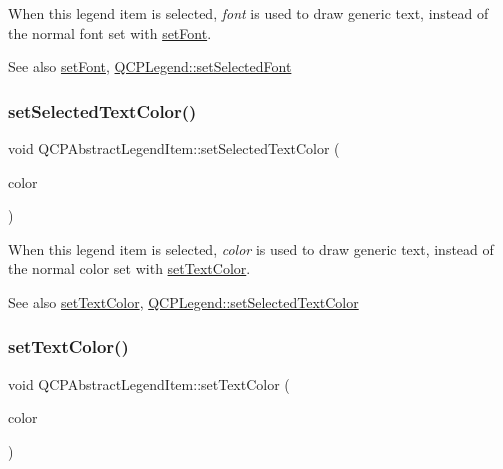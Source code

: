 When this legend item is selected, {\itshape font} is used to draw generic text, instead of the normal font set with \mbox{\hyperlink{class_q_c_p_abstract_legend_item_a409c53455d8112f71d70c0c43eb10265}{set\+Font}}.

\begin{DoxySeeAlso}{See also}
\mbox{\hyperlink{class_q_c_p_abstract_legend_item_a409c53455d8112f71d70c0c43eb10265}{set\+Font}}, \mbox{\hyperlink{class_q_c_p_legend_ab580a01c3c0a239374ed66c29edf5ad2}{Q\+C\+P\+Legend\+::set\+Selected\+Font}} 
\end{DoxySeeAlso}
\mbox{\label{class_q_c_p_abstract_legend_item_a4d01d008ee1a5bfe9905b0397a421936}} 
\subsubsection{\texorpdfstring{setSelectedTextColor()}{setSelectedTextColor()}}
{\footnotesize\ttfamily void Q\+C\+P\+Abstract\+Legend\+Item\+::set\+Selected\+Text\+Color (\begin{DoxyParamCaption}\item[{const Q\+Color \&}]{color }\end{DoxyParamCaption})}

When this legend item is selected, {\itshape color} is used to draw generic text, instead of the normal color set with \mbox{\hyperlink{class_q_c_p_abstract_legend_item_a6ebace6aaffaedcdab2d74e88acc2d1e}{set\+Text\+Color}}.

\begin{DoxySeeAlso}{See also}
\mbox{\hyperlink{class_q_c_p_abstract_legend_item_a6ebace6aaffaedcdab2d74e88acc2d1e}{set\+Text\+Color}}, \mbox{\hyperlink{class_q_c_p_legend_a7674dfc7a1f30e1abd1018c0ed45e0bc}{Q\+C\+P\+Legend\+::set\+Selected\+Text\+Color}} 
\end{DoxySeeAlso}
\mbox{\label{class_q_c_p_abstract_legend_item_a6ebace6aaffaedcdab2d74e88acc2d1e}} 
\subsubsection{\texorpdfstring{setTextColor()}{setTextColor()}}
{\footnotesize\ttfamily void Q\+C\+P\+Abstract\+Legend\+Item\+::set\+Text\+Color (\begin{DoxyParamCaption}\item[{const Q\+Color \&}]{color }\end{DoxyParamCaption})}

